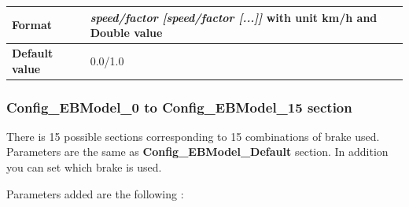 \begin{itemize}
\begin{longtable}{|l|l|}
				\hline
				
				\begin{minipage}[t]{0.22\linewidth} \textbf{Format}	\end{minipage}
				&	\begin{minipage}[t]{0.78\linewidth} \textit{speed/factor [speed/factor [...]]}  with unit km/h and Double value\end{minipage} \\
				
				\hline
				
				\begin{minipage}[t]{0.22\linewidth} \textbf{Default value}	\end{minipage}
				&	\begin{minipage}[t]{0.78\linewidth} 0.0/1.0 \end{minipage} \\
				
				\hline
			\end{longtable}
			
		\end{itemize}

\subsubsection{Config\_EBModel\_0 to Config\_EBModel\_15 section}

	There is 15 possible sections corresponding to 15 combinations of brake used.
	Parameters are the same as \textbf{Config\_EBModel\_Default} section. In addition you can set which brake is used.
	
	Parameters added are the following :

